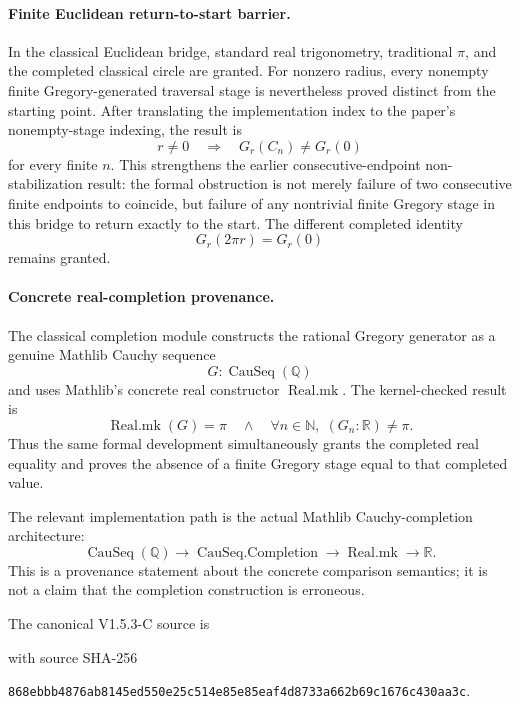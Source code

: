 \documentclass[11pt,a4paper]{article}
\begin{document}
\paragraph{Finite Euclidean return-to-start barrier.}
In the classical Euclidean bridge, standard real trigonometry,
traditional \(\pi\), and the completed classical circle are granted.
For nonzero radius, every nonempty finite Gregory-generated traversal
stage is nevertheless proved distinct from the starting point.  After
translating the implementation index to the paper's nonempty-stage
indexing, the result is
\[
\boxed{
r\neq0
\quad\Longrightarrow\quad
G_r(C_n)\neq G_r(0)
}
\]
for every finite \(n\).
This strengthens the earlier consecutive-endpoint non-stabilization
result: the formal obstruction is not merely failure of two
consecutive finite endpoints to coincide, but failure of any
nontrivial finite Gregory stage in this bridge to return exactly to
the start.  The different completed identity
\[
G_r(2\pi r)=G_r(0)
\]
remains granted.

\paragraph{Concrete real-completion provenance.}
The classical completion module constructs the rational Gregory
generator as a genuine Mathlib Cauchy sequence
\[
G:\operatorname{CauSeq}(\mathbb Q)
\]
and uses Mathlib's concrete real constructor
\(\operatorname{Real.mk}\).  The kernel-checked result is
\[
\boxed{
\operatorname{Real.mk}(G)=\pi
\quad\land\quad
\forall n\in\mathbb N,\;
(G_n:\mathbb R)\neq\pi .
}
\]
Thus the same formal development simultaneously grants the completed
real equality and proves the absence of a finite Gregory stage equal
to that completed value.

The relevant implementation path is the actual Mathlib
Cauchy-completion architecture:
\[
\operatorname{CauSeq}(\mathbb Q)
\longrightarrow
\operatorname{CauSeq.Completion}
\longrightarrow
\operatorname{Real.mk}
\longrightarrow
\mathbb R.
\]
This is a provenance statement about the concrete comparison semantics;
it is not a claim that the completion construction is erroneous.

The canonical V1.5.3-C source is
\begin{center}
\end{center}
with source SHA-256
\begin{center}
\texttt{868ebbb4876ab8145ed550e25c514e85e85eaf4d8733a662b69c1676c430aa3c}.
\end{center}
\end{document}
